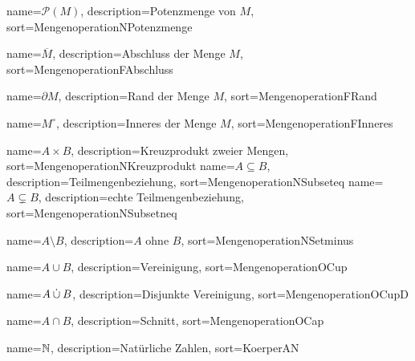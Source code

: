 
{
  name={\ensuremath{\mathcal{P}(M)}},
  description={Potenzmenge von $M$},
  sort=MengenoperationNPotenzmenge
}

{
  name={\ensuremath{\overline{M}}},
  description={Abschluss der Menge $M$},
  sort=MengenoperationFAbschluss
}

{
  name={\ensuremath{\partial M}},
  description={Rand der Menge $M$},
  sort=MengenoperationFRand
}

{
  name={\ensuremath{M^\circ}},
  description={Inneres der Menge $M$},
  sort=MengenoperationFInneres
}

{
  name={\ensuremath{A \times B}},
  description={Kreuzprodukt zweier Mengen},
  sort=MengenoperationNKreuzprodukt
}
{
  name={\ensuremath{A \subseteq B}},
  description={Teilmengenbeziehung},
  sort=MengenoperationNSubseteq
}
{
  name={\ensuremath{A \subsetneq B}},
  description={echte Teilmengenbeziehung},
  sort=MengenoperationNSubsetneq
}

{
  name={\ensuremath{A \setminus B}},
  description={$A$ ohne $B$},
  sort=MengenoperationNSetminus
}

{
  name={\ensuremath{A \cup B}},
  description={Vereinigung},
  sort=MengenoperationOCup
}

{
  name={\ensuremath{A \dcup B}},
  description={Disjunkte Vereinigung},
  sort=MengenoperationOCupD
}

{
  name={\ensuremath{A \cap B}},
  description={Schnitt},
  sort=MengenoperationOCap
}

{
  name={\ensuremath{\mdn}},
  description={Natürliche Zahlen},
  sort=KoerperAN
}

